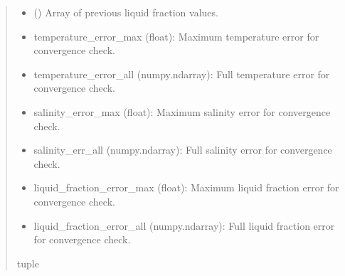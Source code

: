 \documentclass[a4paper,11pt,english,openany]{sphinxmanual}
\begin{document}
\begin{fulllineitems}
\begin{quote}
\begin{description}
\begin{itemize}
\item {} 
\sphinxAtStartPar
{} () \textendash{} Array of previous liquid fraction values.

\end{itemize}

\sphinxAtStartPar
\begin{description}
\begin{itemize}
\item {} 
\sphinxAtStartPar
temperature\_error\_max (float): Maximum temperature error for convergence check.

\item {} 
\sphinxAtStartPar
temperature\_error\_all (numpy.ndarray): Full temperature error for convergence check.

\item {} 
\sphinxAtStartPar
salinity\_error\_max (float): Maximum salinity error for convergence check.

\item {} 
\sphinxAtStartPar
salinity\_err\_all (numpy.ndarray): Full salinity error for convergence check.

\item {} 
\sphinxAtStartPar
liquid\_fraction\_error\_max (float): Maximum liquid fraction error for convergence check.

\item {} 
\sphinxAtStartPar
liquid\_fraction\_error\_all (numpy.ndarray): Full liquid fraction error for convergence check.

\end{itemize}

\end{description}


\sphinxAtStartPar
tuple

\end{description}\end{quote}

\end{fulllineitems}

\end{document}
